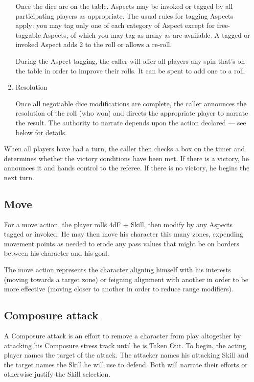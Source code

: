 \begin{enumerate}
Once the dice are on the table, Aspects may be invoked or tagged by all participating players as appropriate. The usual rules for tagging Aspects apply: you may tag only one of each category of Aspect except for free-taggable Aspects, of which you may tag as many as are available. A tagged or invoked Aspect adds 2 to the roll or allows a re-roll.

During the Aspect tagging, the caller will offer all players any spin that's on the table in order to improve their rolls. It can be spent to add one to a roll.

\item Resolution

Once all negotiable dice modifications are complete, the caller announces the resolution of the roll (who won) and directs the appropriate player to narrate the result. The authority to narrate depends upon the action declared --- see below for details.

\end{enumerate}

When all players have had a turn, the caller then checks a box on the timer and determines whether the victory conditions have been met. If there is a victory, he announces it and hands control to the referee. If there is no victory, he begins the next turn.

\subsection{Move}\label{sec:Move}

For a move action, the player rolls 4dF + Skill, then modify by any Aspects tagged or invoked. He may then move his character this many zones, expending movement points as needed to erode any pass values that might be on borders between his character and his goal.

The move action represents the character aligning himself with his interests (moving towards a target zone) or feigning alignment with another in order to be more effective (moving closer to another in order to reduce range modifiers).

\subsection{Composure attack}\label{sec:Composure attack}

A Composure attack is an effort to remove a character from play altogether by attacking his Composure stress track until he is Taken Out. To begin, the acting player names the target of the attack. The attacker names his attacking Skill and the target names the Skill he will use to defend. Both will narrate their efforts or otherwise justify the Skill selection.

